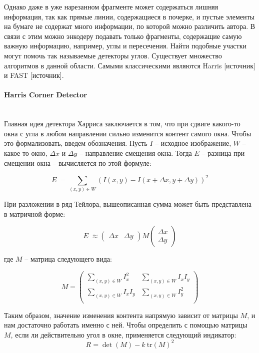     Однако даже в уже нарезанном фрагменте может содержаться лишняя информация, так как прямые линии, содержащиеся в почерке, и пустые элементы на бумаге не содержат много информации, по которой можно различить автора. В связи с этим можно энкодеру подавать только фрагменты, содержащие самую важную информацию, например, углы и пересечения. Найти подобные участки могут помочь так называемые детекторы углов. Существует множество алгоритмов в данной области. Самыми классическими являются Harris [источник] и FAST [источник].

    \paragraph{Harris Corner Detector}\mbox{} \\
    Главная идея детектора Харриса заключается в том, что при сдвиге какого-то окна с угла в любом направлении сильно изменится контент самого окна. Чтобы это формализовать, введем обозначения. Пусть $I$ -- исходное изображение, $W$ -- какое то окно, $\Delta x$ и $\Delta y$ -- направление смещения окна. Тогда $E$ -- разница при смещении окна -- вычисляется по этой формуле:

    $$
    E \; = \sum_{(x, y) \in W} \left( I(x, y) - I(x + \Delta x, y + \Delta y)\right)^2
    $$
    \smallskip
    \noindent

    При разложении в ряд Тейлора, вышеописанная сумма может быть представлена в матричной форме:

    $$
    E \; \approx \begin{pmatrix}
        \Delta x & \Delta y
        \end{pmatrix} 
        M\begin{pmatrix}
        \Delta x\\
        \Delta y
        \end{pmatrix}
    $$

    \smallskip
    \noindent
    где $M$ -- матрица следующего вида:

    $$
    M = \begin{pmatrix}
        \sum_{(x, y) \in W} I^2_x & \sum_{(x, y) \in W} I_x I_y \\
        \sum_{(x, y) \in W} I_x I_y & \sum_{(x, y) \in W} I^2_y \\
    \end{pmatrix}
    $$

    \bigskip
    \noindent

    Таким образом, значение изменения контента напрямую зависит от матрицы $M$, и нам достаточно работать именно с ней. Чтобы определить с помощью матрицы $M$, если ли действительно угол в окне, применяется следующий индикатор:
    $$
        R = \det(M) - k \: \text{tr}(M)^2
    $$
    \noindent

